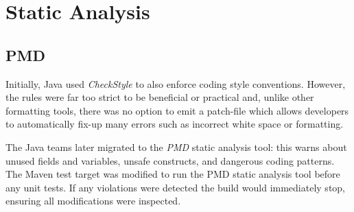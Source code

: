 \section{Static Analysis}
\subsection{PMD}
\par
Initially, Java used \textit{CheckStyle} to also enforce coding style conventions. However, the rules were far too strict to be beneficial or practical and, unlike other formatting tools, there was no option to emit a patch-file which allows developers to automatically fix-up many errors such as incorrect white space or formatting.

\par
The Java teams later migrated to the \textit{PMD}\cite{PMD} static analysis tool: this warns about unused fields and variables, unsafe constructs, and dangerous coding patterns.
The Maven test target was modified to run the PMD static analysis tool before any unit tests. If any violations were detected the build would immediately stop, ensuring all modifications were inspected.